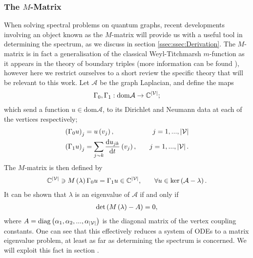 \subsubsection{The $M$-Matrix} \label{sssec:MMatrix}
When solving spectral problems on quantum graphs, recent developments involving an object known as the $M$-matrix will provide us with a useful tool in determining the spectrum, as we discuss in section \ref{ssec:ssec:Derivation}.
The $M$-matrix is in fact a generalisation of the classical Weyl-Titchmarsh $m$-function as it appears in the theory of boundary triples (more information can be found ), however here we restrict ourselves to a short review the specific theory that will be relevant to this work.
Let $\mathcal{A}$ be the graph Laplacian, and define the maps
\begin{align*}
	\Gamma_0, \Gamma_1: \mathrm{dom}\mathcal{A} \rightarrow \mathbb{C}^{\left\lvert \mathcal{V} \right\rvert};
\end{align*}
which send a function $u\in\mathrm{dom}\mathcal{A}$, to its Dirichlet and Neumann data at each of the vertices respectively;
\begin{align*}
	\left( \Gamma_0 u \right)_j &= u\left( v_j \right), \quad &j=1,...,\left\lvert \mathcal{V} \right\rvert \\
	\left( \Gamma_1 u \right)_j &= \sum_{j\sim k}\dfrac{\mathrm{d}u_{jk}}{\mathrm{d}t}\left( v_j \right), \quad &j=1,...,\left\lvert \mathcal{V} \right\rvert. 
\end{align*}
The $M$-matrix is then defined by
\begin{align*}
	\mathbb{C}^{\left\lvert \mathcal{V} \right\rvert} \ni M\left( \lambda \right)\Gamma_0 u &= \Gamma_1 u \in \mathbb{C}^{\left\lvert \mathcal{V} \right\rvert},
	 &\quad \forall u\in\mathrm{ker}\left( \mathcal{A}-\lambda \right).
\end{align*}
It can be shown that $\lambda$ is an eigenvalue of $\mathcal{A}$ if and only if
\begin{align*}
	\mathrm{det}\left( M\left( \lambda \right) - A \right)= 0,
\end{align*}
where $A = \mathrm{diag}\left( \alpha_1, \alpha_2, ... , \alpha_{\left\lvert \mathcal{V} \right\rvert} \right)$ is the diagonal matrix of the vertex coupling constants.
One can see that this effectively reduces a system of ODEs to a matrix eigenvalue problem, at least as far as determining the spectrum is concerned.
We will exploit this fact in section .


